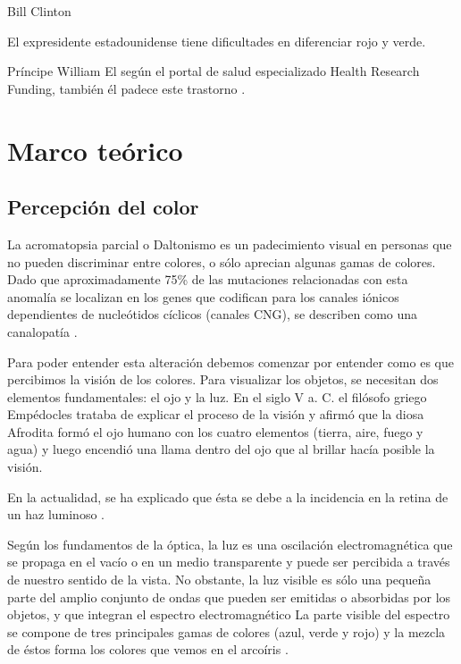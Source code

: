\documentclass[10pt]{article}
\begin{document}
\newpage
Bill Clinton

El expresidente estadounidense tiene dificultades en diferenciar rojo y verde.

\setlength{\parskip}{2mm}

Príncipe William
El según el portal de salud especializado Health Research Funding, también él padece este trastorno \cite{IEEEreferencias:Ref11}.

\section{Marco teórico }
\subsection{Percepción del color} 

La acromatopsia parcial o Daltonismo es un padecimiento visual en personas que no pueden discriminar entre colores, o sólo aprecian algunas gamas de colores. Dado que aproximadamente 75\% de las mutaciones relacionadas con esta anomalía se localizan en los genes que codifican para los canales iónicos dependientes de nucleótidos cíclicos (canales CNG), se describen como una canalopatía \cite{IEEEreferencias:Ref12}.

\setlength{\parskip}{2mm}

Para poder entender esta alteración debemos comenzar por entender como es que percibimos la visión de los colores.
Para visualizar los objetos, se necesitan dos elementos fundamentales: el ojo y la luz. En el siglo V a. C. el filósofo griego Empédocles trataba de explicar el proceso de la visión y afirmó que la diosa Afrodita formó el ojo humano con los cuatro elementos (tierra, aire, fuego y agua) y luego encendió una llama dentro del ojo que al brillar hacía posible la visión.

\setlength{\parskip}{2mm}

En la actualidad, se ha explicado que ésta se debe a la incidencia en la retina de un haz luminoso \cite{IEEEreferencias:Ref13}.

\setlength{\parskip}{2mm}

Según los fundamentos de la óptica, la luz es una oscilación electromagnética que se propaga en el vacío o en un medio transparente y puede ser percibida a través de nuestro sentido de la vista. No obstante, la luz visible es sólo una pequeña parte del amplio conjunto de ondas que pueden ser emitidas o absorbidas por los objetos, y que integran el espectro electromagnético La parte visible del espectro se compone de tres principales gamas de colores (azul, verde y rojo) y la mezcla de éstos forma los colores que vemos en el arcoíris \cite{IEEEreferencias:Ref12}.
\end{document}
